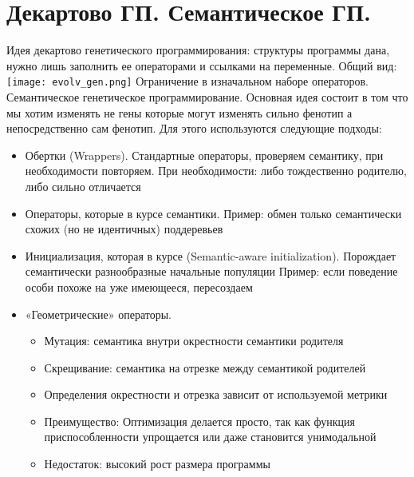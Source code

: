\section{Декартово ГП. Семантическое ГП.}
Идея декартово генетического программирования: структуры программы дана, нужно лишь заполнить ее операторами и ссылками на переменные.
Общий вид:
\texttt{[image: evolv\_gen.png]}
Ограничение в изначальном наборе операторов. 
Семантическое генетическое программирование. Основная идея состоит в том что мы хотим изменять не гены которые могут изменять сильно фенотип а непосредственно сам фенотип. 
Для этого используются следующие подходы:
\begin{itemize}
	\item Обертки (Wrappers). Стандартные операторы, проверяем семантику, при необходимости повторяем. При необходимости: либо тождественно родителю, либо сильно отличается
	\item Операторы, которые в курсе семантики. Пример: обмен только семантически схожих (но не идентичных) поддеревьев
	\item Инициализация, которая в курсе (Semantic-aware initialization). Порождает семантически разнообразные начальные популяции Пример: если поведение особи похоже на уже имеющееся, пересоздаем
	\item «Геометрические» операторы. 
	\begin{itemize}
		\item Мутация: семантика внутри окрестности семантики родителя
		\item Скрещивание: семантика на отрезке между семантикой родителей
		\item Определения окрестности и отрезка зависит от используемой метрики
		\item Преимущество: Оптимизация делается просто, так как функция приспособленности упрощается или даже становится унимодальной
		\item Недостаток: высокий рост размера программы
	\end{itemize}
\end{itemize}

